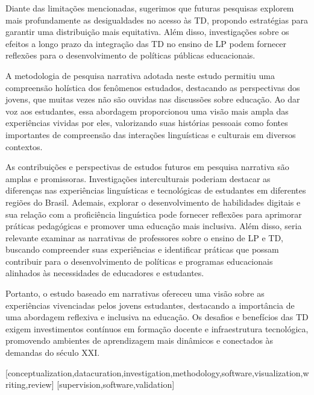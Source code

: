 \documentclass[portuguese]{textolivre}
\begin{document}
Diante das limitações mencionadas, sugerimos que futuras pesquisas explorem mais profundamente as desigualdades no acesso às TD, propondo estratégias para garantir uma distribuição mais equitativa. Além disso, investigações sobre os efeitos a longo prazo da integração das TD no ensino de LP podem fornecer reflexões para o desenvolvimento de políticas públicas educacionais.

A metodologia de pesquisa narrativa adotada neste estudo permitiu uma compreensão holística dos fenômenos estudados, destacando as perspectivas dos jovens, que muitas vezes não são ouvidas nas discussões sobre educação. Ao dar voz aos estudantes, essa abordagem proporcionou uma visão mais ampla das experiências vividas por eles, valorizando suas histórias pessoais como fontes importantes de compreensão das interações linguísticas e culturais em diversos contextos.

As contribuições e perspectivas de estudos futuros em pesquisa narrativa são amplas e promissoras. Investigações interculturais poderiam destacar as diferenças nas experiências linguísticas e tecnológicas de estudantes em diferentes regiões do Brasil. Ademais, explorar o desenvolvimento de habilidades digitais e sua relação com a proficiência linguística pode fornecer reflexões para aprimorar práticas pedagógicas e promover uma educação mais inclusiva. Além disso, seria relevante examinar as narrativas de professores sobre o ensino de LP e TD, buscando compreender suas experiências e identificar práticas que possam contribuir para o desenvolvimento de políticas e programas educacionais alinhados às necessidades de educadores e estudantes.

Portanto, o estudo baseado em narrativas ofereceu uma visão sobre as experiências vivenciadas pelos jovens estudantes, destacando a importância de uma abordagem reflexiva e inclusiva na educação. Os desafios e benefícios das TD exigem investimentos contínuos em formação docente e infraestrutura tecnológica, promovendo ambientes de aprendizagem mais dinâmicos e conectados às demandas do século XXI.


\printbibliography\label{sec-bib}


\begin{contributors}
[conceptualization,datacuration,investigation,methodology,software,visualization,writing,review]
[supervision,software,validation]
\end{contributors}
\end{document}
